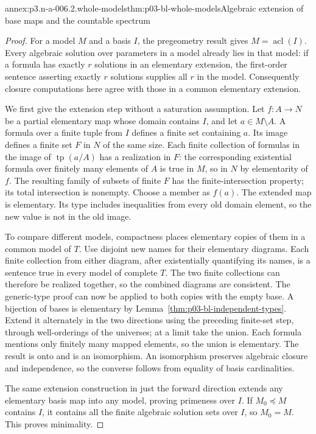 \begin{annexitem}{annex:p3.n-a-006.2.whole-models}{thm:p03-bl-whole-models}{Algebraic extension of base maps and the countable spectrum}
\begin{proof}
For a model \(M\) and a basis \(I\), the pregeometry result gives
\(M=\operatorname{acl}(I)\). Every algebraic solution over parameters
in a model already lies in that model: if a formula has exactly
\(r\) solutions in an elementary extension, the first-order sentence
asserting exactly \(r\) solutions supplies all \(r\) in the model.
Consequently closure computations here agree with those in a common
elementary extension.

We first give the extension step without a saturation assumption.
Let \(f:A\to N\) be a partial elementary map whose domain contains
\(I\), and let \(a\in M\setminus A\). A formula over a finite
tuple from \(I\) defines a finite set containing \(a\). Its image
defines a finite set \(F\) in \(N\) of the same size. Each finite
collection of formulas in the image of \(\operatorname{tp}(a/A)\)
has a realization in \(F\): the corresponding existential formula
over finitely many elements of \(A\) is true in \(M\), so in \(N\)
by elementarity of \(f\). The resulting family of subsets of finite
\(F\) has the finite-intersection property; its total intersection
is nonempty. Choose a member as \(f(a)\). The extended map is
elementary. Its type includes inequalities from every old domain
element, so the new value is not in the old image.

To compare different models, compactness places elementary copies
of them in a common model of \(T\). Use disjoint new names for their
elementary diagrams. Each finite collection from either diagram,
after existentially quantifying its names, is a sentence true in
every model of complete \(T\). The two finite collections can
therefore be realized together, so the combined diagrams are
consistent. The generic-type proof can now be applied to both
copies with the empty base.
A bijection of bases is elementary by
Lemma~\ref{thm:p03-bl-independent-types}. Extend it alternately in
the two directions using the preceding finite-set step, through
well-orderings of the universes; at a limit take the union. Each
formula mentions only finitely many mapped elements, so the union
is elementary. The result is onto and is an isomorphism.
An isomorphism preserves algebraic closure and independence, so the
converse follows from equality of basis cardinalities.

The same extension construction in just the forward direction
extends any elementary basis map into any model, proving primeness
over \(I\). If \(M_0\preccurlyeq M\) contains \(I\), it contains
all the finite algebraic solution sets over \(I\), so
\(M_0=M\). This proves minimality.


\end{proof}
\end{annexitem}
